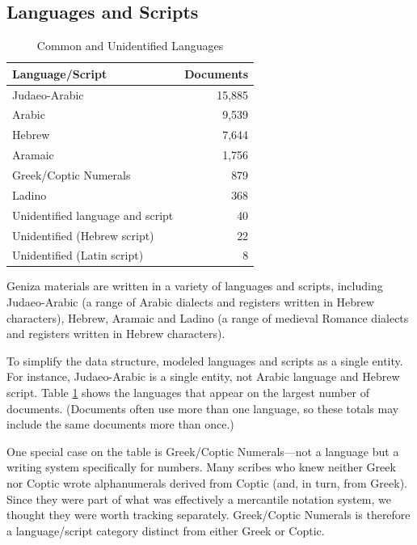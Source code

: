 \documentclass{article}
\begin{document}
\subsection{Languages and Scripts}

\begin{table}
\begin{center}
\caption{Common and Unidentified Languages}
\label{table:langs_docs}
\begin{tabular}{lr}
\toprule
Language/Script & Documents \\
\midrule
Judaeo-Arabic & 15,885 \\
Arabic & 9,539 \\
Hebrew & 7,644 \\
Aramaic & 1,756 \\
Greek/Coptic Numerals & 879 \\
Ladino & 368 \\
\midrule
Unidentified language and script & 40 \\
Unidentified (Hebrew script) & 22 \\
Unidentified (Latin script) & 8 \\
\bottomrule
\end{tabular}
\end{center}
\end{table}


Geniza materials are written in a variety of languages and scripts, including Judaeo-Arabic (a range of Arabic dialects and registers written in Hebrew characters), Hebrew, Aramaic and Ladino (a range of medieval Romance dialects and registers written in Hebrew characters).

To simplify the data structure,  modeled languages and scripts as a single entity. For instance, Judaeo-Arabic is a single entity, not Arabic language and Hebrew script. Table \ref{table:langs_docs} shows the languages that appear on the largest number of documents. (Documents often use more than one language, so these totals may include the same documents more than once.) 

One special case on the table is Greek/Coptic Numerals—not a language but a writing system specifically for numbers. Many scribes who knew neither Greek nor Coptic wrote alphanumerals derived from Coptic (and, in turn, from Greek). Since they were part of what was effectively a mercantile notation system, we thought they were worth tracking separately. Greek/Coptic Numerals is therefore a language/script category distinct from either Greek or Coptic.
\end{document}

